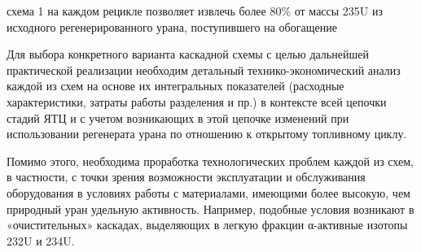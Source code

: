  схема 1 на каждом рецикле позволяет извлечь более 80\% от массы 235U из исходного регенерированного урана, поступившего на обогащение


Для выбора конкретного варианта каскадной схемы с целью дальнейшей практической реализации необходим детальный технико-экономический анализ каждой из схем на основе их интегральных показателей (расходные характеристики, затраты работы разделения и пр.) в контексте всей цепочки стадий ЯТЦ и с учетом возникающих в этой цепочке изменений при использовании регенерата урана по отношению к открытому топливному циклу. 

Помимо этого, необходима проработка технологических проблем каждой из схем, в частности, с точки зрения возможности эксплуатации и обслуживания оборудования в условиях работы с материалами, имеющими более высокую, чем природный уран удельную активность. Например, подобные условия возникают в «очистительных» каскадах, выделяющих в легкую фракции α-активные изотопы 232U и 234U. 
